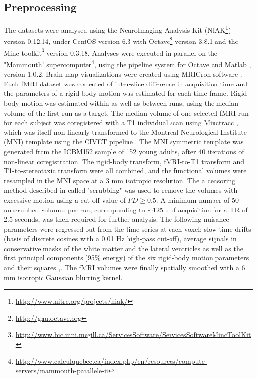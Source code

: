\subsection{Preprocessing}\label{Preprocessing}
The datasets were analysed using the NeuroImaging Analysis Kit (NIAK\footnote{\url{http://www.nitrc.org/projects/niak/}}) version 0.12.14, under CentOS version 6.3 with Octave\footnote{\url{http://gnu.octave.org}} version 3.8.1 and the Minc toolkit\footnote{\url{http://www.bic.mni.mcgill.ca/ServicesSoftware/ServicesSoftwareMincToolKit}} version 0.3.18. Analyses were executed in parallel on the "Mammouth" supercomputer\footnote{\url{http://www.calculquebec.ca/index.php/en/resources/compute-servers/mammouth-parallele-ii}}, using the pipeline system for Octave and Matlab \citep{Bellec2010}, version 1.0.2. Brain map visualizations were created using MRICron software \cite{Rorden2007}. Each fMRI dataset was corrected of inter-slice difference in acquisition time and the parameters of a rigid-body motion was estimated for each time frame. Rigid-body motion was estimated within as well as between runs, using the median volume of the first run as a target. The median volume of one selected fMRI run for each subject 
was 
coregistered with a T1 individual scan using Minctracc \citep{Collins1998}, which was itself non-linearly transformed to the Montreal Neurological Institute (MNI) template \citep{Fonov2011} using the CIVET pipeline \citep{Zijdenbos2002}. The MNI symmetric template was generated from the ICBM152 sample of 152 young adults, after 40 iterations of non-linear coregistration. The rigid-body transform, fMRI-to-T1 transform and T1-to-stereotaxic transform were all combined, and the functional volumes were resampled in the MNI space at a 3 mm isotropic resolution. The a censoring method described in \citep{Power2012} called "scrubbing" was used to remove the volumes with excessive motion using a cut-off value of $FD\geq0.5$. A minimum number of 50 unscrubbed volumes per run, corresponding to $\sim 125$ s of acquisition for a TR of 2.5 seconds, was then required for further analysis. The following nuisance parameters were regressed out from the time series at each voxel: slow time drifts (basis of discrete cosines 
with a 0.01 Hz high-pass cut-off), average signals in conservative masks of the white matter and the lateral ventricles as well as the first principal components (95\% energy) of the six rigid-body motion parameters and their squares \citep{Lund2006},\citep{Giove2009}. The fMRI volumes were finally spatially smoothed with a 6 mm isotropic Gaussian blurring kernel. 

